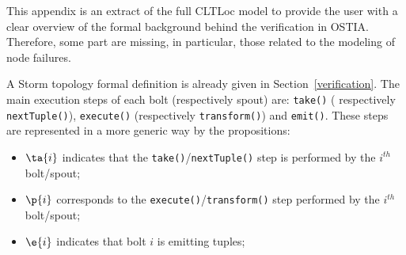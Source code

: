 \onecolumn
% 
%
%
%
%
%

This appendix is an extract of the full CLTLoc model to provide the user with a clear overview of the formal background behind the verification in OSTIA.
Therefore, some part are missing, in particular, those related to the modeling of node failures.

A Storm topology formal definition is already given in Section~\ref{verification}.
The main execution steps of each bolt (respectively spout) are: \texttt{take()} ( respectively \texttt{nextTuple()}), \texttt{execute()} (respectively \texttt{transform()}) and \texttt{emit()}. These steps are represented in a more generic way by the propositions:
\begin{itemize}
\item[] $\ta{i}$ indicates that the \texttt{take()}/\texttt{nextTuple()} step is performed by the $i^{th}$ bolt/spout;
\item[] $\p{i}$ corresponds to the \texttt{execute()}/\texttt{transform()} step performed by the $i^{th}$ bolt/spout; 
\item[] $\e{i}$ indicates that bolt $i$ is emitting tuples;
\end{itemize}

